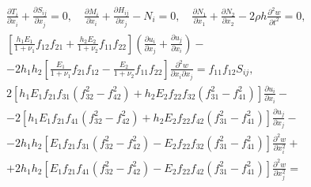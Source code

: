 \begin{equation}

 \label{anofr:eq_13} 

\begin{aligned}

\frac{\partial T_{i} }{\partial x_{i}^{} } +\frac{\partial S_{ij} }{\partial x_{j}^{} } =0, \quad 

\frac{\partial M_{i} }{\partial x_{i} } +\frac{\partial H_{ij} }{\partial x_{j} } -N_{i} =0, \quad  

\frac{\partial N_{1} }{\partial x_{1} } +\frac{\partial N_{2} }{\partial x_{2} } -2\rho h\frac{\partial ^{2} w}{\partial t^{2} } =0,   \\

\left[\frac{h_{1} E_{1} }{1+\nu _{1} } f_{12} f_{21} +\frac{h_{2} E_{2} }{1+\nu _{2} } f_{11} f_{22} \right]\left(\frac{\partial u_{i} }{\partial x_{j} } +\frac{\partial u_{j} }{\partial x_{i} } \right)-  \phantom{~~~~~~~~~~~~~~~~~~~~~~~~~~~~~~~~} \\

-2h_{1} h_{2} \left[\frac{E_{1} }{1+\nu _{1} } f_{21} f_{12} -\frac{E_{2} }{1+\nu _{2} } f_{11} f_{22} \right]\frac{\partial ^{2} w}{\partial x_{i} \partial x_{j} } =f_{11} f_{12} S_{ij},     \\

2\left[h_{1} E_{1} f_{21} f_{31} (f_{32}^{2} -f_{42}^{2} )+h_{2} E_{2} f_{22} f_{32} (f_{31}^{2} -f_{41}^{2} )\right]\frac{\partial u_{i} }{\partial x_{i} } - 

\phantom{~~~~~~~~~~~~~~~~~~~~}\\

-2\left[h_{1} E_{1} f_{21} f_{41} (f_{32}^{2} -f_{42}^{2} )+h_{2} E_{2} f_{22} f_{42} (f_{31}^{2} -f_{41}^{2} )\right]\frac{\partial u_{j} }{\partial x_{j} } -  

\phantom{~~~~~~~~~} \\

-2h_{1} h_{2} \left[E_{1} f_{21} f_{31} (f_{32}^{2} -f_{42}^{2} )-E_{2} f_{22} f_{32} (f_{31}^{2} -f_{41}^{2} )\right]\frac{\partial ^{2} w}{\partial x_{i}^{2} } +   

\phantom{~~~~~~~~~}\\

+2h_{1} h_{2} \left[E_{1} f_{21} f_{41} (f_{32}^{2} -f_{42}^{2} )-E_{2} f_{22} f_{42} (f_{31}^{2} -f_{41}^{2} )\right]\frac{\partial ^{2} w}{\partial x_{j}^{2} } =  

\phantom{~~~~~~~~~} \\


\end{aligned}
\end{equation}

